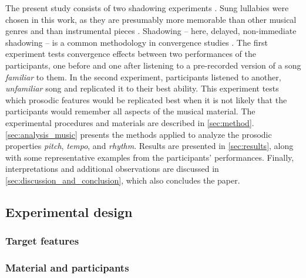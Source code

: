 
The present study consists of two shadowing experiments \citep[cf.][]{Goldinger1998echoes}.
Sung lullabies were chosen in this work, as they are presumably more memorable than other musical genres and than instrumental pieces \citep{Weiss2012something, Trehub1991music}.
Shadowing -- here, delayed, non-immediate shadowing -- is a common methodology in convergence studies \citep[e.g.,][]{Pardo2018comparison}.
The first experiment tests convergence effects between two performances of the participants, one before and one after listening to a pre-recorded version of a song \emph{familiar} to them.
In the second experiment, participants listened to another, \emph{unfamiliar} song and replicated it to their best ability.
This experiment tests which prosodic features would be replicated best when it is not likely that the participants would remember all aspects of the musical material.
The experimental procedures and materials are described in \cref{sec:method}.
\cref{sec:analysis_music} presents the methods applied to analyze the prosodic properties \emph{pitch}, \emph{tempo}, and \emph{rhythm}.
Results are presented in \cref{sec:results}, along with some representative examples from the participants' performances.
Finally, interpretations and additional observations are discussed in \cref{sec:discussion_and_conclusion}, which also concludes the paper.

\subsection{Experimental design}
\label{subsec:design_music}

\subsubsection{Target features}
\label{subsubsec:target_features_music}

\subsubsection{Material and participants}
\label{subsubsec:material_participants_music}

